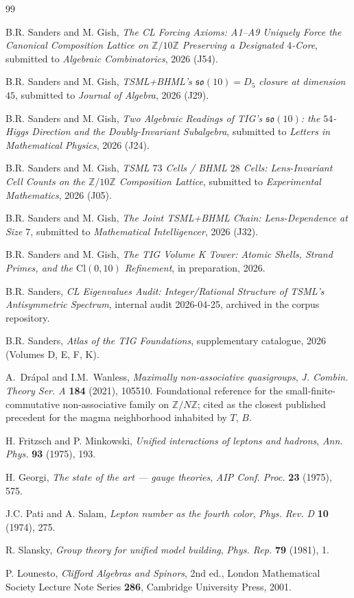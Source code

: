 \documentclass[11pt,reqno]{amsart}
\theoremstyle{definition}
\newcommand{\Z}{\mathbb{Z}}
\newcommand{\so}{\mathfrak{so}}
\newcommand{\Cl}{\mathrm{Cl}}
\newcommand{\TSML}{T}
\newcommand{\BHML}{B}
\begin{document}
\begin{thebibliography}{99}

B.R. Sanders and M. Gish, \emph{The CL Forcing Axioms: A1--A9
Uniquely Force the Canonical Composition Lattice on $\Z/10\Z$
Preserving a Designated $4$-Core}, submitted to
\emph{Algebraic Combinatorics}, 2026 (J54).

B.R. Sanders and M. Gish, \emph{TSML+BHML's $\so(10) = D_5$
closure at dimension $45$}, submitted to \emph{Journal of Algebra},
2026 (J29).

B.R. Sanders and M. Gish, \emph{Two Algebraic Readings of TIG's
$\so(10)$: the $54$-Higgs Direction and the Doubly-Invariant
Subalgebra}, submitted to \emph{Letters in Mathematical Physics},
2026 (J24).

B.R. Sanders and M. Gish, \emph{TSML $73$ Cells / BHML $28$ Cells:
Lens-Invariant Cell Counts on the $\Z/10\Z$ Composition Lattice},
submitted to \emph{Experimental Mathematics}, 2026 (J05).

B.R. Sanders and M. Gish, \emph{The Joint TSML+BHML Chain:
Lens-Dependence at Size $7$}, submitted to \emph{Mathematical
Intelligencer}, 2026 (J32).

B.R. Sanders and M. Gish, \emph{The TIG Volume K Tower: Atomic
Shells, Strand Primes, and the $\Cl(0, 10)$ Refinement},
in preparation, 2026.

B.R. Sanders, \emph{CL Eigenvalues Audit: Integer/Rational
Structure of TSML's Antisymmetric Spectrum}, internal audit
2026-04-25, archived in the corpus repository.

B.R. Sanders, \emph{Atlas of the TIG Foundations}, supplementary
catalogue, 2026 (Volumes D, E, F, K).

A.~Drápal and I.M.~Wanless, \emph{Maximally non-associative
quasigroups}, \emph{J. Combin. Theory Ser. A} \textbf{184} (2021),
105510. Foundational reference for the small-finite-commutative
non-associative family on $\Z/N\Z$; cited as the closest published
precedent for the magma neighborhood inhabited by $\TSML$, $\BHML$.

H. Fritzsch and P. Minkowski, \emph{Unified interactions of leptons
and hadrons}, \emph{Ann. Phys.} \textbf{93} (1975), 193.

H. Georgi, \emph{The state of the art --- gauge theories},
\emph{AIP Conf. Proc.} \textbf{23} (1975), 575.

J.C. Pati and A. Salam, \emph{Lepton number as the fourth color},
\emph{Phys. Rev. D} \textbf{10} (1974), 275.

R. Slansky, \emph{Group theory for unified model building},
\emph{Phys. Rep.} \textbf{79} (1981), 1.

P. Lounesto, \emph{Clifford Algebras and Spinors}, 2nd ed.,
London Mathematical Society Lecture Note Series \textbf{286},
Cambridge University Press, 2001.

\end{thebibliography}
\end{document}
